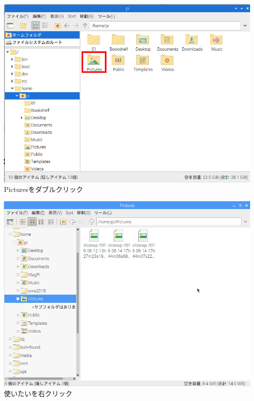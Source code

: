 \begin{minipage}{0.45\linewidth}
  \includegraphics[width=\linewidth]{text01-img/textbook-img164.png}
   Picturesをダブルクリック
\end{minipage}
\hspace{10mm}
\begin{minipage}{0.45\linewidth}
  \includegraphics[width=\linewidth]{text01-img/textbook-img162.png}
   使いたいを右クリック
\end{minipage}

\bigskip


